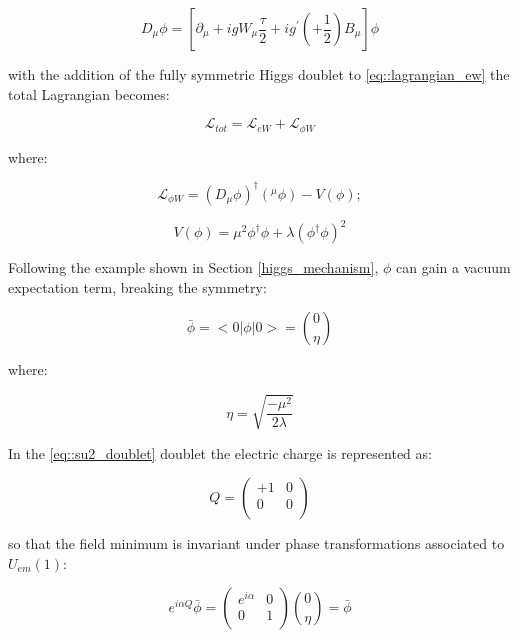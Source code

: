 \begin{equation}
D_{\mu}\phi = [\partial_{\mu} + igW_{\mu} \dfrac{\tau}{2}  + ig^{\prime}(+\dfrac{1}{2})B_{\mu}]\phi 
\end{equation}


with the addition of the fully symmetric Higgs doublet to \ref{eq::lagrangian_ew} the total Lagrangian becomes:

\begin{equation}
\mathcal{L}_{tot} = \mathcal{L}_{eW} + \mathcal{L}_{\phi W}
\end{equation}

where:

\begin{equation}
\mathcal{L}_{\phi W} = (D_{\mu}\phi)^{\dagger} (^{\mu}\phi) - V (\phi);
\label{eq::lagrangian_phiW}
\end{equation}

\begin{equation}
V(\phi) = \mu^{2}\phi^{\dagger}\phi + \lambda(\phi^{\dagger}\phi)^{2}
\end{equation}

Following the example shown in Section \ref{higgs_mechanism}, $\phi$ can gain a vacuum expectation term, breaking the symmetry:

\begin{equation}
 \bar{\phi}= < 0|\phi|0 > = \binom{0}{\eta}
 \label{eq::vacuum_expectation}
\end{equation}

where:

\begin{equation}
\eta = \sqrt{\dfrac{-\mu^{2}}{2\lambda}}
\label{eq::eta_value}
\end{equation}

In the \ref{eq::su2_doublet} doublet the electric charge is represented as:

\begin{equation}
Q = 
\begin{pmatrix}
+1 & 0 \\
0 & 0 \\
\end{pmatrix}
\end{equation}

so that the field minimum is invariant under phase transformations associated to $U_{em}(1)$:

\begin{equation}
e^{i\alpha Q} \bar{\phi} = 
\begin{pmatrix}
e^{i\alpha} & 0 \\
0 & 1 \\ 
\end{pmatrix}
\binom{0}{\eta}
= \bar{\phi}
\end{equation}

